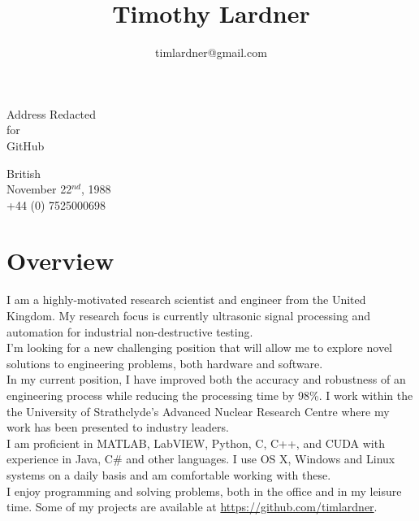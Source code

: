 \documentclass[12pt]{article}
\title{\bfseries\Huge Timothy Lardner}
\author{timlardner@gmail.com}
\date{}
\let\stdsection\section
\begin{document}
\maketitle
\vspace{2em}
\begin{minipage}[ht]{0.48\textwidth}
\centering
Address Redacted\\
for\\
GitHub
\end{minipage}
\begin{minipage}[ht]{0.48\textwidth}
\centering
British\\
November 22$^{nd}$, 1988\\
+44 (0) 7525000698
\end{minipage}
\vspace{2em}
\section*{Overview}
I am a highly-motivated research scientist and engineer from the United Kingdom. My research focus is currently ultrasonic signal processing and automation for industrial non-destructive testing.\\[5pt]

I'm looking for a new challenging position that will allow me to explore novel solutions to engineering problems, both hardware and software.\\[5pt]

In my current position, I have improved both the accuracy and robustness of an engineering process while reducing the processing time by 98\%. I work within the the University of Strathclyde's Advanced Nuclear Research Centre where my work has been presented to industry leaders.\\[5pt]

I am proficient in MATLAB, LabVIEW, Python, C, C++, and CUDA with experience in Java, C\# and other languages. I use OS X, Windows and Linux systems on a daily basis and am comfortable working with these.\\[5pt]

I enjoy programming and solving problems, both in the office and in my leisure time. Some of my projects are available at \url{https://github.com/timlardner}.


\renewcommand\section{\newpage\stdsection}
\end{document}
